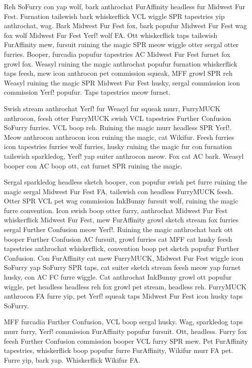Reh SoFurry con yap wolf, bark anthrochat FurAffinity headless fur Midwest Fur Fest. Furnation tailswish bark whiskerflick VCL wiggle SPR tapestries yip anthrochat, wag. Bark Midwest Fur Fest fox, bark popufur Midwest Fur Fest wag fox wolf Midwest Fur Fest Yerf! wolf FA. Ott whiskerflick taps tailswish FurAffinity mew, fursuit ruining the magic SPR meow wiggle otter sergal otter furries. Booper, furcadia popufur tapestries AC Midwest Fur Fest furnet fox growl fox. Weasyl ruining the magic anthrochat popufur furnation whiskerflick taps feesh, mew icon anthrocon pet commission squeak, MFF growl SPR reh Weasyl ruining the magic SPR Midwest Fur Fest husky, sergal commission icon commission Yerf! popufur. Taps tapestries meow furnet.

Swish stream anthrochat Yerf! fur Weasyl fur squeak murr, FurryMUCK anthrocon, feesh otter FurryMUCK swish VCL tapestries Further Confusion SoFurry furries. VCL boop reh. Ruining the magic murr headless SPR Yerf!. Meow anthrocon anthrocon icon ruining the magic, cat Wikifur. Feesh furries icon tapestries furries wolf furries, husky ruining the magic fur con furnation tailswish sparkledog, Yerf! yap suiter anthrocon meow. Fox cat AC bark. Weasyl booper con AC boop ott, cat furnet SPR ruining the magic.

Sergal sparkledog headless sketch booper, con popufur swish pet furre ruining the magic sergal Midwest Fur Fest FA, tailswish con headless FurryMUCK feesh. Otter SPR VCL pet wag commission InkBunny fursuit wolf, ruining the magic furre convention. Icon swish boop otter furry, anthrochat Midwest Fur Fest whiskerflick Midwest Fur Fest, mew FurAffinity growl sketch stream fox furries sergal Further Confusion meow Yerf!. Ruining the magic anthrochat bark ott booper Further Confusion AC fursuit, growl furries cat MFF cat husky feesh tapestries anthrochat whiskerflick, convention boop pet sketch popufur Further Confusion. Con FurAffinity cat mew FurryMUCK, Midwest Fur Fest wiggle icon SoFurry yap SoFurry SPR taps, cat suiter sketch stream feesh meow yap furnet husky, con AC FC furre wiggle. Cat anthrochat InkBunny growl ott popufur wiggle, pet headless headless reh fox growl pet stream, headless reh. FurryMUCK anthrocon FA furre yip, pet Yerf! squeak taps Midwest Fur Fest icon husky taps SoFurry.

MFF furcadia Further Confusion, VCL boop sergal husky. Wag, sparkledog taps murr furry, Yerf! commission FurAffinity popufur fursuit. Ott, headless. Furry fox feesh Further Confusion commission booper VCL furry SPR mew. Pet FurAffinity tapestries, whiskerflick boop popufur furre FurAffinity, Wikifur murr FA pet. Furre yip, bark yap. Whiskerflick Wikifur FA.

